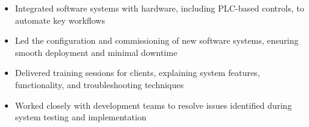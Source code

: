 \par\bigskip
{}
\par\smallskip
\begin{minipage}{13.75cm}
  \begin{minipage}{6.5cm}
    \begin{itemize}
      \item Integrated software systems with hardware, including PLC-based controls, to automate key workflows
      \item Led the configuration and commissioning of new software systems, ensuring smooth deployment and minimal downtime
    \end{itemize}
  \end{minipage}
  \hfill
  \begin{minipage}{6.5cm}
    \begin{itemize}
      \item Delivered training sessions for clients, explaining system features, functionality, and troubleshooting techniques
      \item Worked closely with development teams to resolve issues identified during system testing and implementation
    \end{itemize}
  \end{minipage}
\end{minipage}
\par\smallskip
\divider

